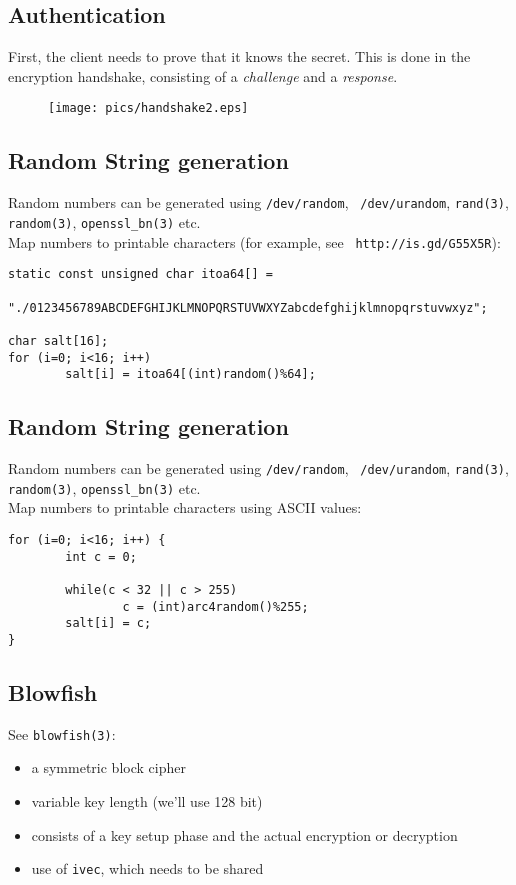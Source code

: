 \documentclass[xga]{xdvislides}
\begin{document}
\subsection{Authentication}
First, the client needs to prove that it knows the secret.  This is done in
the encryption handshake, consisting of a {\em challenge} and a {\em
response}.
\vspace{.125in}
\begin{figure}[hb]
    \begin{center}
        \texttt{[image: pics/handshake2.eps]} \\
    \end{center}
\end{figure}

\subsection{Random String generation}
Random numbers can be generated using {\tt /dev/random}, {\tt
/dev/urandom}, {\tt rand(3)}, {\tt random(3)}, {\tt openssl\_bn(3)} etc.
\\

Map numbers to printable characters (for example, see {\tt
http://is.gd/G55X5R}):

\begin{verbatim}
static const unsigned char itoa64[] =
        "./0123456789ABCDEFGHIJKLMNOPQRSTUVWXYZabcdefghijklmnopqrstuvwxyz";

char salt[16];
for (i=0; i<16; i++)
        salt[i] = itoa64[(int)random()%64];

\end{verbatim}

\subsection{Random String generation}
Random numbers can be generated using {\tt /dev/random}, {\tt
/dev/urandom}, {\tt rand(3)}, {\tt random(3)}, {\tt openssl\_bn(3)} etc.
\\

Map numbers to printable characters using ASCII values:

\begin{verbatim}
for (i=0; i<16; i++) {
        int c = 0;

        while(c < 32 || c > 255)
                c = (int)arc4random()%255;
        salt[i] = c;
}
\end{verbatim}


\subsection{Blowfish}
See {\tt blowfish(3)}:
\begin{itemize}
	\item a symmetric block cipher
	\item variable key length (we'll use 128 bit)
	\item consists of a key setup phase and the actual encryption or
		decryption
	\item use of {\tt ivec}, which needs to be shared
\end{itemize}
\end{document}
